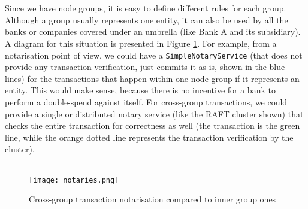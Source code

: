 \documentclass[12pt,twoside]{article}
\begin{document}
\\ \\
Since we have node groups, it is easy to define different rules for each group. Although a group usually represents one entity, it can also be used by all the banks or companies covered under an umbrella (like Bank A and its subsidiary). A diagram for this situation is presented in Figure \ref{fig:notaries}. For example, from a notarisation point of view, we could have a \verb|SimpleNotaryService| (that does not provide any transaction verification, just commits it as is, shown in the blue lines) for the transactions that happen within one node-group if it represents an entity. This would make sense, because there is no incentive for a bank to perform a double-spend against itself. For cross-group transactions, we could provide a single or distributed notary service (like the RAFT cluster shown) that checks the entire transaction for correctness as well (the transaction is the green line, while the orange dotted line represents the transaction verification by the cluster).
\\ \\
\begin{figure}[!htb]
\centering
\texttt{[image: notaries.png]}
\caption{Cross-group transaction notarisation compared to inner group ones}
\centering
\label{fig:notaries}
\end{figure}
\end{document}
